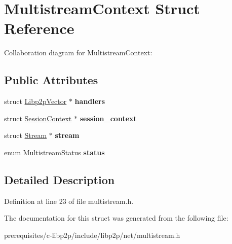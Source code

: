 \hypertarget{struct_multistream_context}{}\section{Multistream\+Context Struct Reference}
\label{struct_multistream_context}


Collaboration diagram for Multistream\+Context\+:
\subsection*{Public Attributes}
\begin{DoxyCompactItemize}
\item 
\mbox{\label{struct_multistream_context_a8bf28fa6a2627bfa879cf5057743429e}} 
struct \mbox{\hyperlink{struct_libp2p_vector}{Libp2p\+Vector}} $\ast$ {\bfseries handlers}
\item 
\mbox{\label{struct_multistream_context_ae9a2e4724cfe2a7646a7054d60ac34a2}} 
struct \mbox{\hyperlink{struct_session_context}{Session\+Context}} $\ast$ {\bfseries session\+\_\+context}
\item 
\mbox{\label{struct_multistream_context_a1dbc77ae2a613e3c59f2e336d7e45cc6}} 
struct \mbox{\hyperlink{struct_stream}{Stream}} $\ast$ {\bfseries stream}
\item 
\mbox{\label{struct_multistream_context_a624499d8db9954bf2ead38149b62dc46}} 
enum Multistream\+Status {\bfseries status}
\end{DoxyCompactItemize}


\subsection{Detailed Description}


Definition at line 23 of file multistream.\+h.



The documentation for this struct was generated from the following file\+:\begin{DoxyCompactItemize}
\item 
prerequisites/c-\/libp2p/include/libp2p/net/multistream.\+h\end{DoxyCompactItemize}
